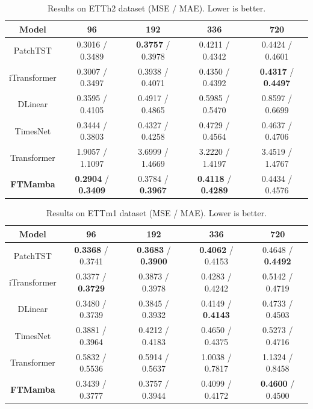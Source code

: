 \documentclass[symmetry,article,submit,pdftex,moreauthors]{Definitions/mdpi}
\begin{document}
\begin{table}[H]
\caption{Results on ETTh2 dataset (MSE / MAE). Lower is better.\label{tab:etth2}}
\begin{tabularx}{\textwidth}{CCCCC}
\toprule
\textbf{Model} & \textbf{96} & \textbf{192} & \textbf{336} & \textbf{720} \\
\midrule
PatchTST     & 0.3016 / 0.3489  & \textbf{0.3757} / 0.3978 & 0.4211 / 0.4342  & 0.4424 / 0.4601  \\
iTransformer & 0.3007 / 0.3497  & 0.3938 / 0.4071  & 0.4350 / 0.4392  & \textbf{0.4317} / \textbf{0.4497} \\
DLinear      & 0.3595 / 0.4105  & 0.4917 / 0.4865  & 0.5985 / 0.5470  & 0.8597 / 0.6699  \\
TimesNet     & 0.3444 / 0.3803  & 0.4327 / 0.4258  & 0.4729 / 0.4564  & 0.4637 / 0.4706  \\
Transformer  & 1.9057 / 1.1097  & 3.6999 / 1.4669  & 3.2220 / 1.4197  & 3.4519 / 1.4767  \\
\textbf{FTMamba}  & \textbf{0.2904} / \textbf{0.3409} & 0.3784 / \textbf{0.3967} & \textbf{0.4118} / \textbf{0.4289} & 0.4434 / 0.4576  \\
\bottomrule
\end{tabularx}
\end{table}

\begin{table}[H]
\caption{Results on ETTm1 dataset (MSE / MAE). Lower is better.\label{tab:ettm1}}
\begin{tabularx}{\textwidth}{CCCCC}
\toprule
\textbf{Model} & \textbf{96} & \textbf{192} & \textbf{336} & \textbf{720} \\
\midrule
PatchTST     & \textbf{0.3368} / 0.3741  & \textbf{0.3683} / \textbf{0.3900} & \textbf{0.4062} / 0.4153  & 0.4648 / \textbf{0.4492} \\
iTransformer & 0.3377 / \textbf{0.3729} & 0.3873 / 0.3978  & 0.4283 / 0.4242  & 0.5142 / 0.4719  \\
DLinear      & 0.3480 / 0.3739  & 0.3845 / 0.3932  & 0.4149 / \textbf{0.4143} & 0.4733 / 0.4503  \\
TimesNet     & 0.3881 / 0.3964  & 0.4212 / 0.4183  & 0.4650 / 0.4375  & 0.5273 / 0.4716  \\
Transformer  & 0.5832 / 0.5536  & 0.5914 / 0.5637  & 1.0038 / 0.7817  & 1.1324 / 0.8458  \\
\textbf{FTMamba}  & 0.3439 / 0.3777  & 0.3757 / 0.3944  & 0.4099 / 0.4172  & \textbf{0.4600} / 0.4500  \\
\bottomrule
\end{tabularx}
\end{table}
\end{document}
